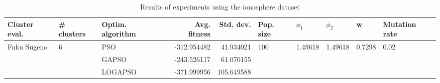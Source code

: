 \begin{table}
\centering
\caption{Results of experiments using the ionosphere dataset}
\begin{tabular}{lllrrlllll}
\toprule
               Cluster eval. &        \# clusters & Optim. algorithm &  Avg. fitness &  Std. dev. &            Pop. size &               $\phi_{1}$ &               $\phi_{2}$ &                       w &         Mutation rate \\
\midrule
\multirow{3}{*}{Fuku Sugeno} & \multirow{3}{*}{6} &              PSO &   -312.954482 &  41.934021 & \multirow{3}{*}{100} & \multirow{3}{*}{1.49618} & \multirow{3}{*}{1.49618} & \multirow{3}{*}{0.7298} & \multirow{3}{*}{0.02} \\
                             &                    &            GAPSO &   -243.526117 &  61.070155 &                      &                          &                          &                         &                       \\
                             &                    &          LOGAPSO &   -371.999956 & 105.649588 &                      &                          &                          &                         &                       \\
\bottomrule
\end{tabular}
\end{table}

